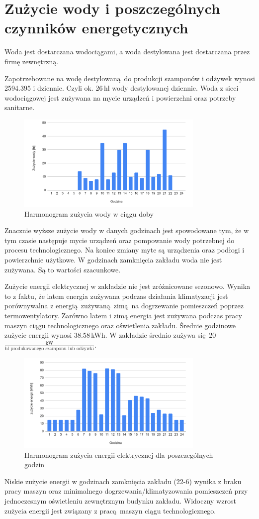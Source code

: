\section{Zużycie wody i poszczególnych czynników energetycznych}

Woda jest dostarczana wodociągami, a woda destylowana jest dostarczana przez firmę zewnętrzną.

Zapotrzebowane na wodę destylowaną do produkcji szamponów i odżywek wynosi 2594.395 i dziennie. Czyli ok. 26\,hl wody destylowanej dziennie. Woda z sieci wodociągowej jest zużywana na mycie urządzeń i powierzchni oraz potrzeby sanitarne.

\begin{figure}[h]
	\centering
	\includegraphics[width=0.8\textwidth]{./sec16/wykres1.png}
	\caption{Harmonogram zużycia wody w ciągu doby}
\end{figure}

Znacznie wyższe zużycie wody w danych godzinach jest spowodowane tym, że w tym czasie następuje mycie urządzeń oraz pompowanie wody potrzebnej do procesu technologicznego. Na koniec zmiany myte są urządzenia oraz podłogi i powierzchnie użytkowe. W godzinach zamknięcia zakładu woda nie jest zużywana. Są to wartości szacunkowe.

Zużycie energii elektrycznej w zakładzie nie jest zróżnicowane sezonowo. Wynika to z faktu, że latem energia zużywana podczas działania klimatyzacji jest porównywalna z energią zużywaną zimą na dogrzewanie pomieszczeń poprzez termowentylatory.  Zarówno latem i zimą energia jest zużywana podczas pracy maszyn ciągu technologicznego oraz oświetlenia zakładu. Średnie godzinowe zużycie energii wynosi 38.58\,kWh. W zakładzie średnio zużywa się 20$\mathrm{\frac{kW}{hl \text{ produkowanego szamponu lub odżywki}}}$.

\begin{figure}[h]
	\centering
	\includegraphics[width=0.8\textwidth]{./sec16/wykres2.png}
	\caption{Harmonogram zużycia energii elektrycznej dla poszczególnych godzin}
\end{figure}

Niskie zużycie energii w godzinach zamknięcia zakładu (22-6) wynika z braku pracy maszyn oraz minimalnego dogrzewania/klimatyzowania pomieszczeń przy jednoczesnym oświetleniu zewnętrznym budynku zakładu. Widoczny wzrost zużycia energii jest związany z pracą maszyn ciągu technologicznego.
